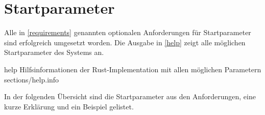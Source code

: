 \clearpage
\section{Startparameter}

Alle in \autoref{requirements} genannten optionalen Anforderungen für Startparameter sind erfolgreich umgesetzt worden.
Die Ausgabe in \autoref{help} zeigt alle möglichen Startparameter des Systems an.

\helpinclude
	{help}
	{Hilfsinformationen der Rust-Implementation mit allen möglichen Parametern}
	{sections/help.info}


In der folgenden Übersicht sind die Startparameter aus den Anforderungen, eine kurze Erklärung und ein Beispiel gelistet.

\newcommand{\proveReq}[3]{\textbf{Anforderung \reqNumberForLabel{#1}: \reqNameForLabel{#1}} \\ #2 \\ Beispiel: \monospaceinline{mecview_server #3}}

